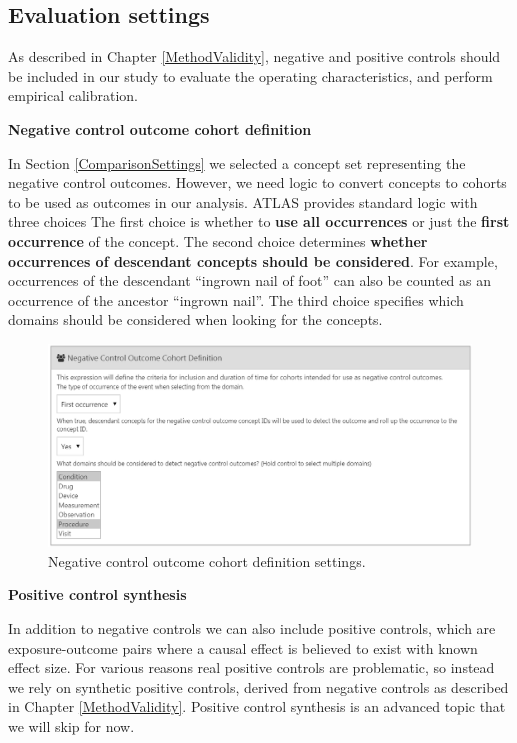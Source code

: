 \documentclass[11pt]{book}
\theoremstyle{definition}
\theoremstyle{definition}
\theoremstyle{definition}
\theoremstyle{remark}
\begin{document}
\hypertarget{evaluationSettings}{%
\subsection{Evaluation settings}\label{evaluationSettings}}

As described in Chapter \ref{MethodValidity}, negative and positive controls should be included in our study to evaluate the operating characteristics, and perform empirical calibration.

\textbf{Negative control outcome cohort definition}

In Section \ref{ComparisonSettings} we selected a concept set representing the negative control outcomes. However, we need logic to convert concepts to cohorts to be used as outcomes in our analysis. ATLAS provides standard logic with three choices The first choice is whether to \textbf{use all occurrences} or just the \textbf{first occurrence} of the concept. The second choice determines \textbf{whether occurrences of descendant concepts should be considered}. For example, occurrences of the descendant ``ingrown nail of foot'' can also be counted as an occurrence of the ancestor ``ingrown nail''. The third choice specifies which domains should be considered when looking for the concepts.

\begin{figure}

{\centering \includegraphics[width=1\linewidth]{images/PopulationLevelEstimation/ncSettings} 

}

\caption{Negative control outcome cohort definition settings.}\label{fig:ncSettings}
\end{figure}

\textbf{Positive control synthesis}

In addition to negative controls we can also include positive controls, which are exposure-outcome pairs where a causal effect is believed to exist with known effect size. For various reasons real positive controls are problematic, so instead we rely on synthetic positive controls, derived from negative controls as described in Chapter \ref{MethodValidity}. Positive control synthesis is an advanced topic that we will skip for now.
\end{document}
